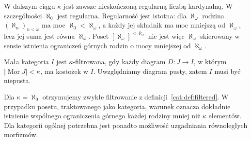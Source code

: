 W dalszym ciągu $\kappa$ jest zawsze nieskończoną regularną liczbą kardynalną. W szczególności $\aleph_0$ jest regularna. Regularność jest istotna: dla $\aleph_\omega$ rodzina $(\aleph_n)_{n<\omega}$ ma moc $\aleph_0<\aleph_\omega$, a każdy jej składnik ma moc mniejszą od $\aleph_\omega$, lecz jej suma jest równa $\aleph_\omega$. Poset $[\aleph_\omega]^{<\aleph_\omega}$ nie jest więc $\aleph_\omega$-skierowany w sensie istnienia ograniczeń górnych rodzin o mocy mniejszej od $\aleph_\omega$.

\begin{definicja}\label{cat:def:accessible-filtered}
Mała kategoria $I$ jest $\kappa$-filtrowana, gdy każdy diagram $D:J\to I$, w którym $|\operatorname{Mor}J|<\kappa$, ma kostożek w $I$. Uwzględniamy diagram pusty, zatem $I$ musi być niepusta.
\end{definicja}

Dla $\kappa=\aleph_0$ otrzymujemy zwykłe filtrowanie z definicji~\ref{cat:def:filtered}. W przypadku posetu, traktowanego jako kategoria, warunek oznacza dokładnie istnienie wspólnego ograniczenia górnego każdej rodziny mniej niż $\kappa$ elementów. Dla kategorii ogólnej potrzebna jest ponadto możliwość uzgadniania równoległych morfizmów.

